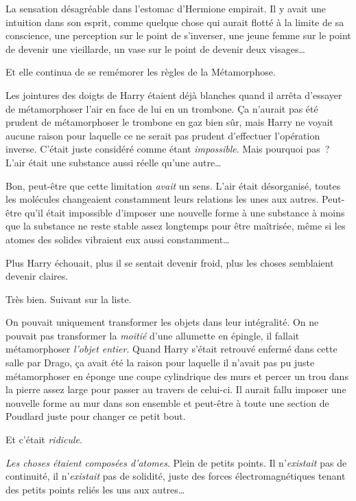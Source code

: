 La sensation désagréable dans l'estomac d'Hermione empirait. Il y avait une intuition dans son esprit, comme quelque chose qui aurait flotté à la limite de sa conscience, une perception sur le point de s'inverser, une jeune femme sur le point de devenir une vieillarde, un vase sur le point de devenir deux visages…

Et elle continua de se remémorer les règles de la Métamorphose.

\later

Les jointures des doigts de Harry étaient déjà blanches quand il arrêta d'essayer de métamorphoser l'air en face de lui en un trombone. Ça n'aurait pas été prudent de métamorphoser le trombone en gaz bien sûr, mais Harry ne voyait aucune raison pour laquelle ce ne serait pas prudent d'effectuer l'opération inverse. C'était juste considéré comme étant \emph{impossible}. Mais pourquoi pas~? L'air était une substance aussi réelle qu'une autre…

Bon, peut-être que cette limitation \emph{avait} un sens. L'air était désorganisé, toutes les molécules changeaient constamment leurs relations les unes aux autres. Peut-être qu'il était impossible d'imposer une nouvelle forme à une substance à moins que la substance ne reste stable assez longtemps pour être maîtrisée, même si les atomes des solides vibraient eux aussi constamment…

Plus Harry échouait, plus il se sentait devenir froid, plus les choses semblaient devenir claires.

Très bien. Suivant sur la liste.

On pouvait uniquement transformer les objets dans leur intégralité. On ne pouvait pas transformer la \emph{moitié} d'une allumette en épingle, il fallait métamorphoser \emph{l'objet entier}. Quand Harry s'était retrouvé enfermé dans cette salle par Drago, ça avait été la raison pour laquelle il n'avait pas pu juste métamorphoser en éponge une coupe cylindrique des murs et percer un trou dans la pierre assez large pour passer au travers de celui-ci. Il aurait fallu imposer une nouvelle forme au mur dans son ensemble et peut-être à toute une section de Poudlard juste pour changer ce petit bout.

Et c'était \emph{ridicule}.

\emph{Les choses étaient composées d'atomes}. Plein de petits points. Il n'\emph{existait} pas de continuité, il n'\emph{existait} pas de solidité, juste des forces électromagnétiques tenant des petits points reliés les uns aux autres…

